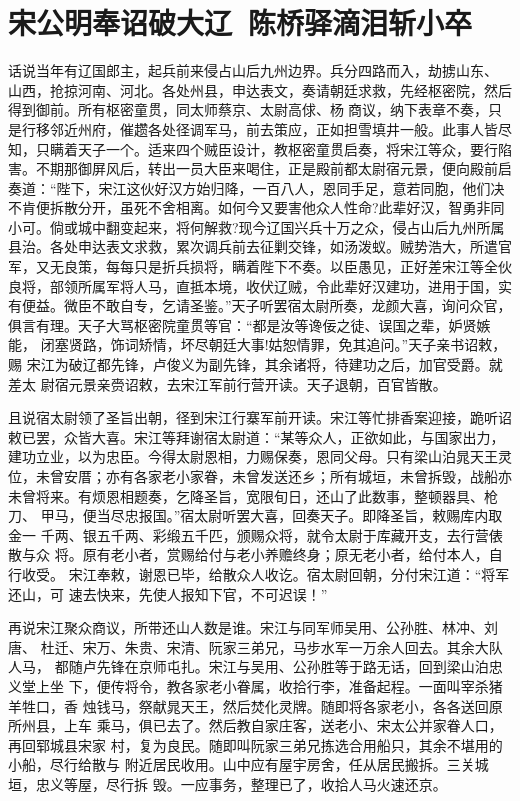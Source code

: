 \chapter{宋公明奉诏破大辽~陈桥驿滴泪斩小卒}

话说当年有辽国郎主，起兵前来侵占山后九州边界。兵分四路而入，劫掳山东、
山西，抢掠河南、河北。各处州县，申达表文，奏请朝廷求救，先经枢密院，然后
得到御前。所有枢密童贯，同太师蔡京、太尉高俅、杨商议，纳下表章不奏，只
是行移邻近州府，催趱各处径调军马，前去策应，正如担雪填井一般。此事人皆尽
知，只瞒着天子一个。适来四个贼臣设计，教枢密童贯启奏，将宋江等众，要行陷
害。不期那御屏风后，转出一员大臣来喝住，正是殿前都太尉宿元景，便向殿前启
奏道：“陛下，宋江这伙好汉方始归降，一百八人，恩同手足，意若同胞，他们决
不肯便拆散分开，虽死不舍相离。如何今又要害他众人性命?此辈好汉，智勇非同
小可。倘或城中翻变起来，将何解救?现今辽国兴兵十万之众，侵占山后九州所属
县治。各处申达表文求救，累次调兵前去征剿交锋，如汤泼蚁。贼势浩大，所遣官
军，又无良策，每每只是折兵损将，瞒着陛下不奏。以臣愚见，正好差宋江等全伙
良将，部领所属军将人马，直抵本境，收伏辽贼，令此辈好汉建功，进用于国，实
有便益。微臣不敢自专，乞请圣鉴。”天子听罢宿太尉所奏，龙颜大喜，询问众官，
俱言有理。天子大骂枢密院童贯等官：“都是汝等谗佞之徒、误国之辈，妒贤嫉能，
闭塞贤路，饰词矫情，坏尽朝廷大事!姑恕情罪，免其追问。”天子亲书诏敕，赐
宋江为破辽都先锋，卢俊义为副先锋，其余诸将，待建功之后，加官受爵。就差太
尉宿元景亲赍诏敕，去宋江军前行营开读。天子退朝，百官皆散。

且说宿太尉领了圣旨出朝，径到宋江行寨军前开读。宋江等忙排香案迎接，跪听诏
敕已罢，众皆大喜。宋江等拜谢宿太尉道：“某等众人，正欲如此，与国家出力，
建功立业，以为忠臣。今得太尉恩相，力赐保奏，恩同父母。只有梁山泊晁天王灵
位，未曾安厝；亦有各家老小家眷，未曾发送还乡；所有城垣，未曾拆毁，战船亦
未曾将来。有烦恩相题奏，乞降圣旨，宽限旬日，还山了此数事，整顿器具、枪刀、
甲马，便当尽忠报国。”宿太尉听罢大喜，回奏天子。即降圣旨，敕赐库内取金一
千两、银五千两、彩缎五千匹，颁赐众将，就令太尉于库藏开支，去行营俵散与众
将。原有老小者，赏赐给付与老小养赡终身；原无老小者，给付本人，自行收受。
宋江奉敕，谢恩已毕，给散众人收讫。宿太尉回朝，分付宋江道：“将军还山，可
速去快来，先使人报知下官，不可迟误！”

再说宋江聚众商议，所带还山人数是谁。宋江与同军师吴用、公孙胜、林冲、刘唐、
杜迁、宋万、朱贵、宋清、阮家三弟兄，马步水军一万余人回去。其余大队人马，
都随卢先锋在京师屯扎。宋江与吴用、公孙胜等于路无话，回到梁山泊忠义堂上坐
下，便传将令，教各家老小眷属，收拾行李，准备起程。一面叫宰杀猪羊牲口，香
烛钱马，祭献晁天王，然后焚化灵牌。随即将各家老小，各各送回原所州县，上车
乘马，俱已去了。然后教自家庄客，送老小、宋太公并家眷人口，再回郓城县宋家
村，复为良民。随即叫阮家三弟兄拣选合用船只，其余不堪用的小船，尽行给散与
附近居民收用。山中应有屋宇房舍，任从居民搬拆。三关城垣，忠义等屋，尽行拆
毁。一应事务，整理已了，收拾人马火速还京。

